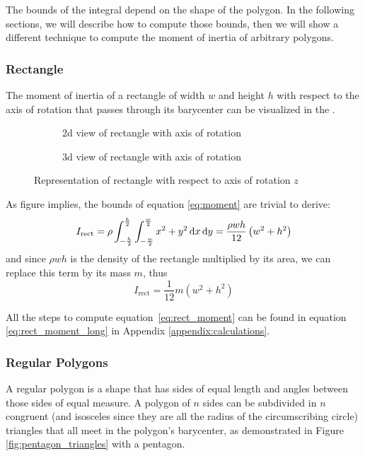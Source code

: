 The bounds of the integral depend on the shape of the polygon. In the following
sections, we will describe how to compute those bounds, then we will show a
different technique to compute the moment of inertia of arbitrary polygons.

\subsubsection{Rectangle}
The moment of inertia of a rectangle of width $w$ and height $h$ with respect to
the axis of rotation that passes through its barycenter can be visualized in the
.

\begin{figure}[H]
	\centering
	\hfill
	\begin{subfigure}[]{.4\textwidth}
		\centering
		\caption{2d view of rectangle with axis of rotation}
		\label{fig:rectangle_inertia2d}
	\end{subfigure}
	\hfill
	\begin{subfigure}[]{.4\textwidth}
		\centering
		\caption{3d view of rectangle with axis of rotation}
		\label{fig:rectangle_inertia3d}
	\end{subfigure}
	\hfill\null
	\caption{Representation of rectangle with respect to axis of rotation $z$}
	\label{fig:rectangle_inertia}
\end{figure}

As figure  implies, the bounds of equation
\ref{eq:moment} are trivial to derive:
\begin{equation}
	\label{eq:rect_moment}
	I_{\text{rect}} = \rho \int_{-\frac{h}{2}}^{\frac{h}{2}}
	\int_{-\frac{w}{2}}^{\frac{w}{2}}  x^2 + y^2 \mathop{}\!\mathrm{d} x \mathop{}\!\mathrm{d} y
	= \frac{\rho wh}{12} \left( w^2 + h^2 \right)
\end{equation}
and since $\rho w h$ is the density of the rectangle multiplied by its area, we
can replace this term by its mass $m$, thus
\begin{equation}
	I_{\text{rect}} = \frac{1}{12} m\left(w^2 + h^2\right)
\end{equation}

All the steps to compute equation~\ref{eq:rect_moment} can be found in equation
\ref{eq:rect_moment_long} in Appendix \ref{appendix:calculations}.

\subsubsection{Regular Polygons}
\label{sub:regular_polygons}
A regular polygon is a shape that has sides of equal length and angles between
those sides of equal measure. A polygon of $n$ sides can be subdivided in $n$
congruent (and isosceles since they are all the radius of the circumscribing
circle) triangles that all meet in the polygon's barycenter,
as demonstrated in Figure \ref{fig:pentagon_triangles} with a pentagon.

